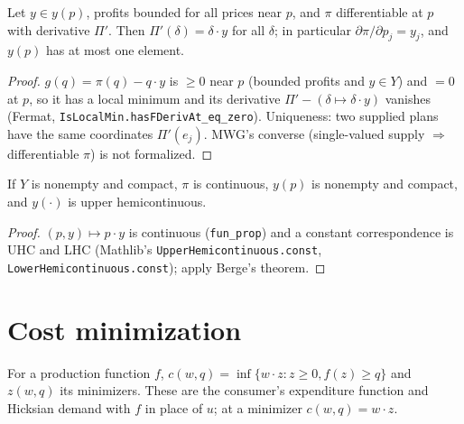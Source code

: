 \begin{theorem}
\label{thm:hotelling}
\leanok
{}
Let $y \in y(p)$, profits bounded for all prices near $p$, and $\pi$ differentiable at $p$ with
derivative $\Pi'$. Then $\Pi'(\delta) = \delta \cdot y$ for all $\delta$; in particular
$\partial \pi/\partial p_j = y_j$, and $y(p)$ has at most one element.
\end{theorem}
\begin{proof}
\leanok
{}
$g(q) = \pi(q) - q\cdot y$ is $\ge 0$ near $p$ (bounded profits and $y \in Y$) and $= 0$ at $p$,
so it has a local minimum and its derivative $\Pi' - (\delta \mapsto \delta\cdot y)$ vanishes
(Fermat, \texttt{IsLocalMin.hasFDerivAt\_eq\_zero}). Uniqueness: two supplied plans have the same
coordinates $\Pi'(e_j)$. MWG's converse (single-valued supply $\Rightarrow$ differentiable $\pi$) is
not formalized.
\end{proof}

\begin{theorem}
\label{thm:berge-supply}
\leanok
{}
If $Y$ is nonempty and compact, $\pi$ is continuous, $y(p)$ is nonempty and compact, and $y(\cdot)$
is upper hemicontinuous.
\end{theorem}
\begin{proof}
\leanok
$(p,y)\mapsto p\cdot y$ is continuous (\texttt{fun\_prop}) and a constant correspondence is UHC and
LHC (Mathlib's \texttt{UpperHemicontinuous.const}, \texttt{LowerHemicontinuous.const}); apply
Berge's theorem.
\end{proof}

\section{Cost minimization}
\label{sec:cost}

\begin{definition}
\label{def:cost-function}
\leanok
{}
For a production function $f$, $c(w,q) = \inf\{w\cdot z : z \ge 0, f(z) \ge q\}$ and $z(w,q)$ its
minimizers. These are the consumer's expenditure function and Hicksian demand with $f$ in place of
$u$; at a minimizer $c(w,q) = w \cdot z$.
\end{definition}

